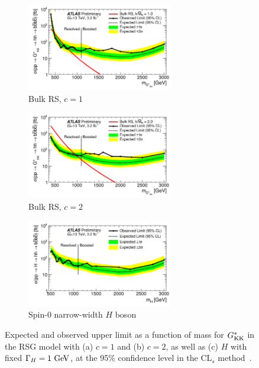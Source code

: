 \begin{figure}[!ht]
\centering
\captionsetup{justification=centering}

    \begin{subfigure}[t]{\textwidth}
        \centering
        \includegraphics[width=0.7\textwidth]{figures/Limit_RSG_c1}
        \caption{Bulk RS, $c = 1$}
    \end{subfigure}%

    \begin{subfigure}[t]{\textwidth}
        \centering
        \includegraphics[width=0.7\textwidth]{figures/Limit_RSG_c2}
        \caption{Bulk RS, $c = 2$}
    \end{subfigure}%

    \begin{subfigure}[t]{\textwidth}
        \centering
        \includegraphics[width=0.7\textwidth]{figures/Limit_H}
        \caption{Spin-0 narrow-width $H$ boson}
    \end{subfigure}%
\caption{Expected and observed upper limit as a function of mass for $G^*_{\rm KK}$ in the RSG model with (a) $c = 1$
  and (b) $c = 2$, as well as (c) $H$ with fixed $\Gamma_H = 1\,\GeV{}$, at the 95\% confidence level in the CL$_{s}$ method~\cite{4bconf}.}
\label{fig:4b_limits}
\end{figure}

